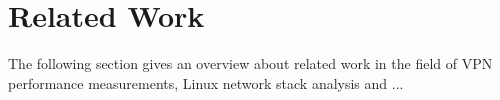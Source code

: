 \documentclass[IN,11pt,twoside,openright,master,english]{tumthesis}
\author{Maximilian~Pudelko}
\date{November 15, 2018}
\begin{document}
%


\maketitle%
\cleardoublepage


\begin{abstract}
	
\end{abstract}

%		



\tableofcontents


\startcontent




\chapter{Related Work}
\label{chap:related_work}

The following section gives an overview about related work in the field of VPN performance measurements, Linux network stack analysis and ...
\end{document}
